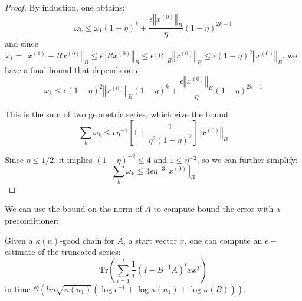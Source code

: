 \begin{proof}
By induction, one obtains: 
\[
\omega_{k}\leq\omega_{1}\left(1-\eta\right)^{k}+\frac{\epsilon\left\Vert x^{\left(0\right)}\right\Vert _{B}}{\eta}\left(1-\eta\right)^{2k-1}
\]
and since $\omega_{1}=\left\Vert x^{\left(1\right)}-Rx^{\left(0\right)}\right\Vert _{B}\leq\epsilon\left\Vert Rx^{\left(0\right)}\right\Vert _{B}\leq\epsilon\left\Vert R\right\Vert _{B}\left\Vert x^{\left(0\right)}\right\Vert _{B}\leq\epsilon\left(1-\eta\right)^{2}\left\Vert x^{\left(0\right)}\right\Vert _{B}$,
we have a final bound that depends on $\epsilon$: 
\[
\omega_{k}\leq\epsilon\left(1-\eta\right)^{2}\left\Vert x^{\left(0\right)}\right\Vert _{B}\left(1-\eta\right)^{k}+\frac{\epsilon\left\Vert x^{\left(0\right)}\right\Vert _{B}}{\eta}\left(1-\eta\right)^{2k-1}
\]


This is the sum of two geometric series, which give the bound: 
\[
\sum_{k}\omega_{k}\leq\epsilon\eta^{-1}\left[1+\frac{1}{\eta^{2}\left(1-\eta\right)^{2}}\right]\left\Vert x^{\left(0\right)}\right\Vert _{B}
\]


Since $\eta\leq1/2$, it implies $\left(1-\eta\right)^{-2}\leq4$
and $1\leq\eta^{-2}$, so we can further simplify: 
\[
\sum_{k}\omega_{k}\leq4\epsilon\eta^{-3}\left\Vert x^{\left(0\right)}\right\Vert _{B}
\]


\end{proof}

We can use the bound on the norm of $A$ to compute bound the error
with a preconditioner:

\begin{proposition} \label{prop:estimate-truncated-series}Given
a $\kappa\left(n\right)$-good chain for $A$, a start vector $x$,
one can compute an $\epsilon-$estimate of the truncated series: 
\[
\mbox{Tr}\left(\sum_{i=1}^{l}\frac{1}{i}\left(I-B_{1}^{-1}A\right)^{i}xx^{T}\right)
\]
in time $\mathcal{O}\left(lm\sqrt{\kappa\left(n_{1}\right)}\left(\log\epsilon^{-1}+\log\kappa\left(n_{1}\right)+\log\kappa\left(B\right)\right)\right)$.\end{proposition} 

